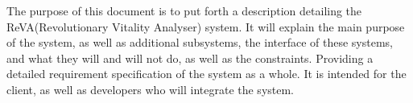 The purpose of this document is to put forth a description detailing the ReVA(Revolutionary Vitality Analyser) system. It will explain the main purpose of the system, as well as additional subsystems, the interface of these systems, and what they will and will not do, as well as the constraints. Providing a detailed requirement specification of the system as a whole. It is intended for the client, as well as developers who will integrate the system.